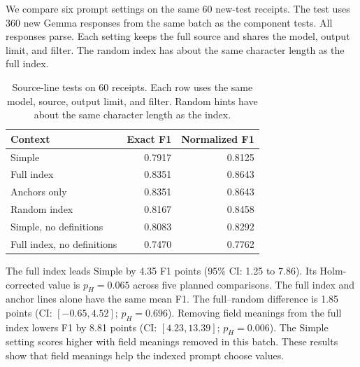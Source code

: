 We compare six prompt settings on the same 60 new-test receipts.
The test uses 360 new Gemma responses from the same batch as the component
tests. All responses parse. Each setting keeps the full source and shares
the model, output limit, and filter.
The random index has about the same character length as the full index.

\begin{table}[t]

\centering

\caption{Source-line tests on 60 receipts. Each row uses the same model, source, output limit, and filter. Random hints have about the same character length as the index.}
\label{tab:recovery_index}

\small

\begin{tabular}{lrr}

\toprule

Context & Exact F1 & Normalized F1 \\

\midrule

Simple & 0.7917 & 0.8125 \\

Full index & 0.8351 & 0.8643 \\

Anchors only & 0.8351 & 0.8643 \\

Random index & 0.8167 & 0.8458 \\

Simple, no definitions & 0.8083 & 0.8292 \\

Full index, no definitions & 0.7470 & 0.7762 \\

\bottomrule

\end{tabular}

\end{table}

The full index leads Simple by 4.35 F1 points (95\% CI: 1.25 to 7.86).
Its Holm-corrected value is $p_H=0.065$ across five planned comparisons.
The full index and anchor lines alone have the same mean F1.
The full--random difference is 1.85 points
(CI: $[-0.65,4.52]$; $p_H=0.696$).
Removing field meanings from the full index lowers F1 by 8.81 points
(CI: $[4.23,13.39]$; $p_H=0.006$).
The Simple setting scores higher with field meanings removed in this batch.
These results show that field meanings help the indexed prompt choose values.

